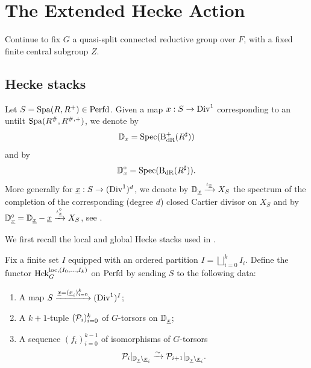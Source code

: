 \section{The Extended Hecke Action}\label{sec:extendedheckestacks}
Continue to fix $G$ a quasi-split connected reductive group over $F$, with a fixed finite central subgroup $Z$.
\subsection{Hecke stacks}\label{sec:hecke-stacks}
Let $S = \mathrm{Spa}(R,R^+) \in \mathrm{Perfd}$. Given a map $x : S \to \mathrm{Div}^1$ corresponding to an untilt $\mathrm{Spa}(R^{\#}, R^{\#,+})$, we denote by 
$$\mathbb{D}_x = \mathrm{Spec}(\mathrm{B}_{\mathrm{dR}}^{+}(R^{\sharp}))$$
and by 
$$\mathbb{D}_x^{\circ} = \mathrm{Spec}(\mathrm{B}_{\mathrm{dR}}(R^{\sharp})).$$
More generally for $\underline{x} : S \to (\mathrm{Div}^1)^d$, we denote by $\mathbb{D}_{\underline{x}} \xrightarrow{\iota_{\underline{x}}} X_{S}$ the spectrum of the completion of the corresponding (degree $d$) closed Cartier divisor on $X_S$ and by $\mathbb{D}_{\underline{x}}^{\circ} = \mathbb{D}_{\underline{x}} - \underline{x} \xrightarrow{\iota_{\underline{x}}^{\circ}} X_{S}$, see \cite[Section VI.1]{Geometrization}.

We first recall the local and global Hecke stacks used in \cite{Geometrization}.

\begin{defi}
Fix a finite set $I$ equipped with an ordered partition $I = \bigsqcup_{i=0}^{k} I_{i}$.
Define the functor $\textnormal{Hck}_{G}^{\textnormal{loc},(I_{0}, \dots, I_{k})}$ on $\mathrm{Perfd}$ by sending $S$ to the following data:
\begin{enumerate}
\item{A map $S \xrightarrow{\underline{x} = (\underline{x}_{i})_{i=0}^{k}}(\mathrm{Div}^{1})^{I}$;}
\item{A $k+1$-tuple $(\mathcal{P}_{i})_{i=0}^{k}$ of $G$-torsors on $\mathbb D_{\underline{x}}$;}
\item{A sequence $(f_{i})_{i=0}^{k-1}$ of isomorphisms of $G$-torsors
\begin{equation*}
    \mathcal{P}_{i}|_{\mathbb D_{\underline{x}} \setminus \underline{x}_{i}} \xrightarrow{\sim} \mathcal{P}_{i+1}|_{\mathbb D_{\underline{x}} \setminus \underline{x}_{i}}.
\end{equation*}
}
\end{enumerate}
\end{defi}

